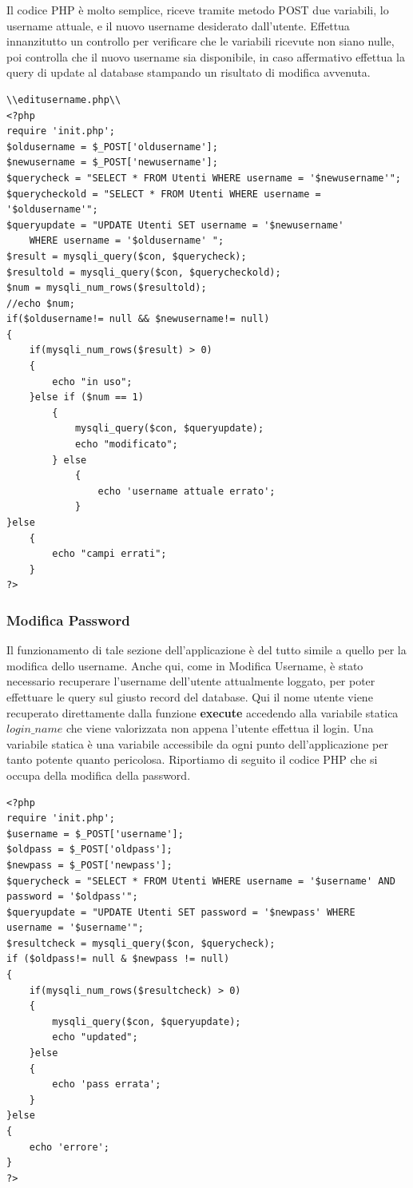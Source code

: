 \documentclass[a4paper, 50pt, twoside]{article}
\begin{document}
Il codice PHP è molto semplice, riceve tramite metodo POST due variabili, lo username attuale, e il nuovo username desiderato dall'utente. Effettua innanzitutto un controllo per verificare che le variabili ricevute non siano nulle, poi controlla che il nuovo username sia disponibile, in caso affermativo effettua la query di update al database stampando un risultato di modifica avvenuta.
\begin{lstlisting}
\\editusername.php\\
<?php 
require 'init.php';
$oldusername = $_POST['oldusername'];
$newusername = $_POST['newusername'];
$querycheck = "SELECT * FROM Utenti WHERE username = '$newusername'";
$querycheckold = "SELECT * FROM Utenti WHERE username = '$oldusername'";
$queryupdate = "UPDATE Utenti SET username = '$newusername' 
	WHERE username = '$oldusername' ";
$result = mysqli_query($con, $querycheck);
$resultold = mysqli_query($con, $querycheckold);
$num = mysqli_num_rows($resultold);
//echo $num;
if($oldusername!= null && $newusername!= null)
{
	if(mysqli_num_rows($result) > 0)
    {
    	echo "in uso";
    }else if ($num == 1)
    	{	
        	mysqli_query($con, $queryupdate);
        	echo "modificato";
        } else
        	{
            	echo 'username attuale errato'; 
            }
}else
	{
    	echo "campi errati";
    }
?>
\end{lstlisting}
\subsubsection{Modifica Password}
Il funzionamento di tale sezione dell’applicazione è del tutto simile a quello per la modifica dello username. Anche qui, come in Modifica Username, è stato necessario recuperare l'username dell'utente attualmente loggato, per poter effettuare le query sul giusto record del database. Qui il nome utente viene recuperato direttamente dalla funzione \textbf{execute} accedendo alla variabile statica $login\_name$ che viene valorizzata non appena l'utente effettua il login. Una variabile statica è una variabile accessibile da ogni punto dell'applicazione per tanto potente quanto pericolosa. Riportiamo di seguito il codice PHP che si occupa della modifica della password.
\begin{lstlisting}
<?php
require 'init.php';
$username = $_POST['username'];
$oldpass = $_POST['oldpass'];
$newpass = $_POST['newpass'];
$querycheck = "SELECT * FROM Utenti WHERE username = '$username' AND 
password = '$oldpass'";
$queryupdate = "UPDATE Utenti SET password = '$newpass' WHERE 
username = '$username'";
$resultcheck = mysqli_query($con, $querycheck);
if ($oldpass!= null & $newpass != null)
{
	if(mysqli_num_rows($resultcheck) > 0)
    {
    	mysqli_query($con, $queryupdate);
        echo "updated";
    }else 
    {
    	echo 'pass errata';
    }
}else
{
	echo 'errore';
}
?>
\end{lstlisting}
\end{document}
